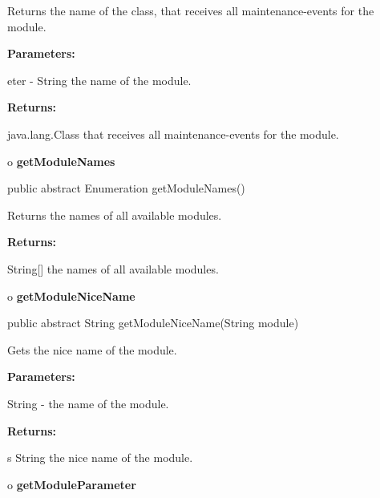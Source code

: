 \begin{description}
\htmlDD Returns the name of the class, that receives all maintenance-events
for the module. 

\begin{description}
\item {\bf Parameters:}  

eter - String the name of the module.  
\item {\bf Returns:}  

java.lang.Class that receives all maintenance-events for the module.  
\end{description}

\end{description}

o {\bf getModuleNames} 

\begin{PRE}
 public abstract Enumeration getModuleNames()
\end{PRE}

\begin{description}
\htmlDD Returns the names of all available modules. 

\begin{description}
\item {\bf Returns:}  

String[] the names of all available modules.  
\end{description}

\end{description}

o {\bf getModuleNiceName} 

\begin{PRE}
 public abstract String getModuleNiceName(String module)
\end{PRE}

\begin{description}
\htmlDD Gets the nice name of the module. 

\begin{description}
\item {\bf Parameters:}  

String - the name of the module.  
\item {\bf Returns:}  

s String the nice name of the module.  
\end{description}

\end{description}

o {\bf getModuleParameter} 

